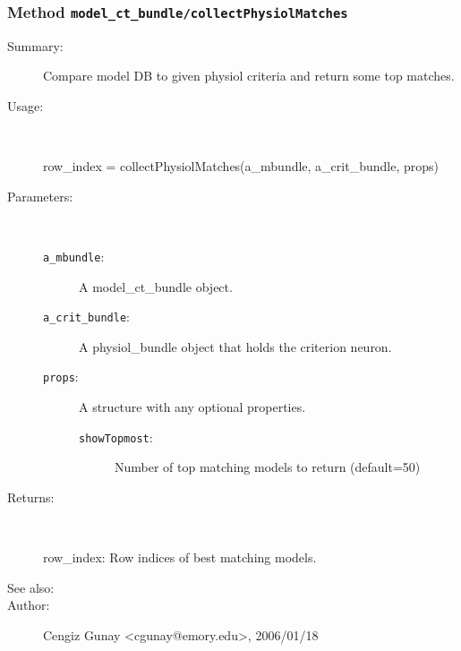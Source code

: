 \subsubsection[Method \texttt{collectPhysiolMatches}]{Method \texttt{model\_ct\_bundle/collectPhysiolMatches}}%
%
\label{ref_model_ct_bundle__collectPhysiolMatches}%
\hypertarget{ref_model_ct_bundle__collectPhysiolMatches}{}%
\begin{description}
\item[Summary:]Compare model DB to given physiol criteria and return some top matches.
%
\item[Usage:]~%
\begin{lyxcode}%
row\_index = collectPhysiolMatches(a\_mbundle, a\_crit\_bundle, props)
%
\end{lyxcode}%
%
%
\item[Parameters:]~
\begin{description}%
\item[\texttt{a\_mbundle}:]
 A model\_ct\_bundle object.
\item[\texttt{a\_crit\_bundle}:]
 A physiol\_bundle object that holds the criterion neuron.
\item[\texttt{props}:]
 A structure with any optional properties.
\begin{description}%
\item[\texttt{showTopmost}:]
 Number of top matching models to return (default=50)
\end{description}%
\end{description}%
%
\item[Returns: ]~

	row\_index: Row indices of best matching models.
%
%
\item[See also:]%
%
\item[Author:]%
Cengiz Gunay <cgunay@emory.edu>, 2006/01/18%
\end{description}
\methodline%
